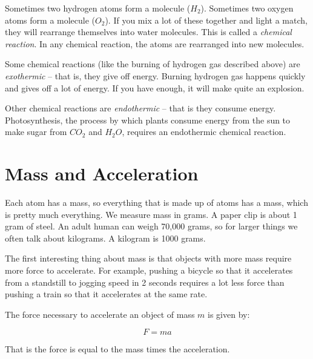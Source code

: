 Sometimes two hydrogen atoms form a molecule ($H_2$). Sometimes two
oxygen atoms form a molecule ($O_2$). If you mix a lot of these
together and light a match, they will rearrange themselves into water
molecules. This is called a \textit{chemical reaction}.  In any
chemical reaction, the atoms are rearranged into new molecules.

Some chemical reactions (like the burning of hydrogen gas described
above) are \textit{exothermic} -- that is, they give off energy.
Burning hydrogen gas happens quickly and gives off a lot of energy. If
you have enough, it will make quite an explosion.

Other chemical reactions are \textit{endothermic} -- that is they consume
energy.  Photosynthesis, the process by which plants consume energy
from the sun to make sugar from $CO_2$ and $H_2O$, requires an endothermic
chemical reaction.

\section{Mass and Acceleration}

Each atom has a mass, so everything that is made up of atoms has a
mass, which is pretty much everything.  We measure mass in grams.  A paper clip is about 1 gram of
steel. An adult human can weigh 70,000 grams, so for larger things we
often talk about kilograms. A kilogram is 1000 grams.

The first interesting thing about mass is that objects with more mass
require more force to accelerate. For example, pushing a bicycle so
that it accelerates from a standstill to jogging speed in 2 seconds
requires a lot less force than pushing a train so that it accelerates
at the same rate.

\begin{mdframed}[style=important, frametitle={Newton's Second Law of Motion}]

The force necessary to accelerate an object of mass $m$ is given by:

$$F = m a$$

That is the force is equal to the mass times the acceleration.

\end{mdframed}

